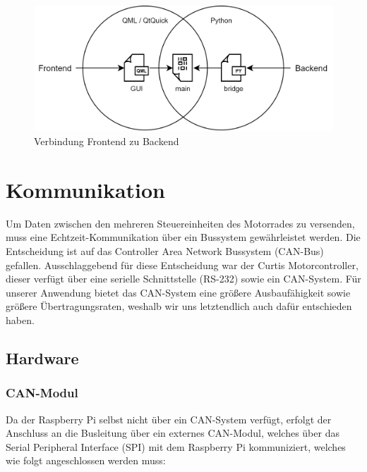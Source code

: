 \begin{figure}[H]
	\begin{center}
		\includegraphics[scale=1]{figures/hcis/bridge.png}
		\caption{Verbindung Frontend zu Backend}
	\end{center}
\end{figure}

\newpage


\section{Kommunikation}

Um Daten zwischen den mehreren Steuereinheiten des Motorrades zu versenden, muss eine Echtzeit-Kommunikation über ein Bussystem gewährleistet werden. Die Entscheidung ist auf das Controller Area Network Bussystem (CAN-Bus) gefallen. Ausschlaggebend für diese Entscheidung war der Curtis Motorcontroller, dieser verfügt über eine serielle Schnittstelle (RS-232) sowie ein CAN-System. Für unserer Anwendung bietet das CAN-System eine größere Ausbaufähigkeit sowie größere Übertragungsraten, weshalb wir uns letztendlich auch dafür entschieden haben.

\subsection{Hardware}

\subsubsection{CAN-Modul}

Da der Raspberry Pi selbst nicht über ein CAN-System verfügt, erfolgt der Anschluss an die Busleitung über ein externes CAN-Modul, welches über das Serial Peripheral Interface (SPI) mit dem Raspberry Pi kommuniziert, welches wie folgt angeschlossen werden muss: 

